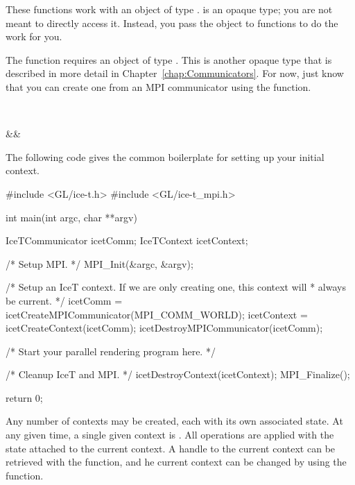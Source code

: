 These functions work with an object of type .
 is an opaque type; you are not meant to directly access
it.  Instead, you pass the object to functions to do the work for you.

The  function requires an object of type
.  This is another opaque type that is described in
more detail in Chapter~\ref{chap:Communicators}.  For now, just know that
you can create one from an MPI communicator using the
 function.

\begin{Table}{3}
  \textC{ }\textC{(} \\
  \qquad\qquad\qquad\qquad\qquad\qquad\qquad\qquad\qquad\qquad\qquad
  \quad{}\quad\textC{);}
\end{Table}
\begin{Table}{3}
  \textC{(}&&\quad\textC{);}
\end{Table}

The following code gives the common boilerplate for setting up your initial
\IceT context.

\begin{code}
#include <GL/ice-t.h>
#include <GL/ice-t_mpi.h>

int main(int argc, char **argv)
{
  IceTCommunicator icetComm;
  IceTContext icetContext;

  /* Setup MPI. */
  MPI_Init(&argc, &argv);

  /* Setup an IceT context.  If we are only creating one, this context will
   * always be current. */
  icetComm = icetCreateMPICommunicator(MPI_COMM_WORLD);
  icetContext = icetCreateContext(icetComm);
  icetDestroyMPICommunicator(icetComm);

  /* Start your parallel rendering program here. */

  /* Cleanup IceT and MPI. */
  icetDestroyContext(icetContext);
  MPI_Finalize();

  return 0;
}
\end{code}

Any number of contexts may be created, each with its own associated state.
At any given time, a single given context is
.  All \IceT operations are applied
with the state attached to the current context.  A handle to the current
\IceT context can be retrieved with the  function,
and he current context can be changed by using the 
function.

